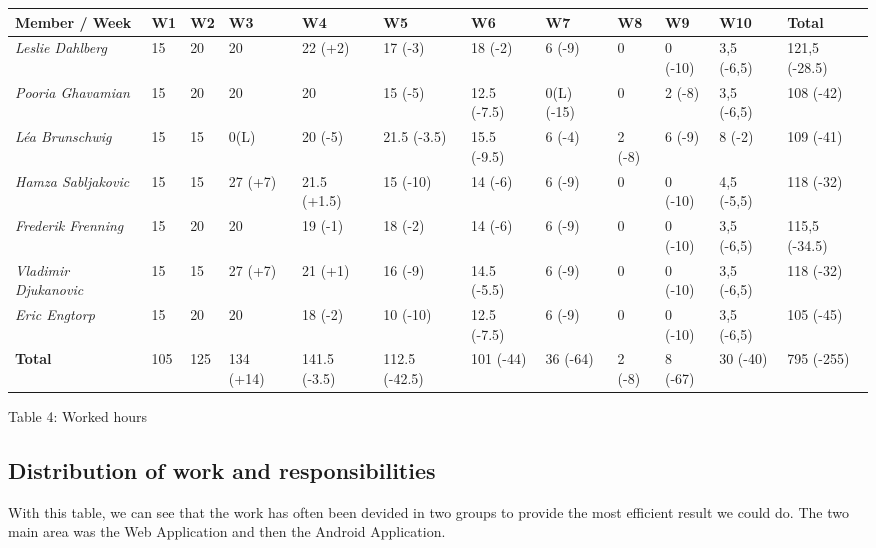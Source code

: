 \documentclass{article}
\begin{document}
\begin{center}
\begin{tabular}{|l|p{0.75cm}|p{0.75cm}|p{0.75cm}|p{0.75cm}|p{0.75cm}|p{0.75cm}|p{0.75cm}|p{0.75cm}|p{0.75cm}|p{0.75cm}|l|}
\hline
\textbf{Member / Week} & \textbf{W1} & \textbf{W2} & \textbf{W3} & \textbf{W4} & \textbf{W5} & \textbf{W6} & \textbf{W7} & \textbf{W8} & \textbf{W9} & \textbf{W10} & \textbf{Total} \\ \hline
\textit{Leslie Dahlberg} & 15 & 20 & 20 & 22 (+2) & 17 (-3) & 18 (-2) & 6 (-9) & 0 & 0 (-10) & 3,5 (-6,5) & 121,5 (-28.5) \\ \hline
\textit{Pooria Ghavamian} & 15 & 20 & 20 & 20 & 15 (-5) & 12.5 (-7.5) & 0(L) (-15) & 0 & 2 (-8) & 3,5 (-6,5) & 108 (-42) \\ \hline
\textit{L\'ea Brunschwig} & 15 & 15 & 0(L) & 20 (-5) & 21.5 (-3.5) & 15.5 (-9.5) & 6 (-4) & 2 (-8) & 6 (-9) & 8 (-2) & 109 (-41) \\ \hline
\textit{Hamza Sabljakovic} & 15 & 15 & 27 (+7) & 21.5 (+1.5) & 15 (-10) & 14 (-6) & 6 (-9) & 0 & 0 (-10) & 4,5 (-5,5) & 118 (-32) \\ \hline
\textit{Frederik Frenning} & 15 & 20 & 20 & 19 (-1) & 18 (-2) & 14 (-6) & 6 (-9) & 0 & 0 (-10) & 3,5 (-6,5) & 115,5 (-34.5) \\ \hline
\textit{Vladimir Djukanovic} & 15 & 15 & 27 (+7) & 21 (+1) & 16 (-9) & 14.5 (-5.5) & 6 (-9) & 0 & 0 (-10) & 3,5 (-6,5) & 118 (-32) \\ \hline
\textit{Eric Engtorp} & 15 & 20 & 20 & 18 (-2) & 10 (-10) & 12.5 (-7.5) & 6 (-9) & 0 & 0 (-10) & 3,5 (-6,5) & 105 (-45) \\ \hline
\textbf{Total} & 105 & 125 & 134 (+14) & 141.5 (-3.5) & 112.5 (-42.5) & 101 (-44) & 36 (-64) & 2 (-8) & 8 (-67) & 30 (-40) & 795 (-255) \\ \hline
\end{tabular}
\end{center}
\begin{center}
\caption{Table 4: Worked hours}
\end{center}

\newpage

\subsection{Distribution of work and responsibilities}

With this table, we can see that the work has often been devided in two groups to provide the most efficient result we could do. The two main area was the Web Application and then the Android Application.
\end{document}
